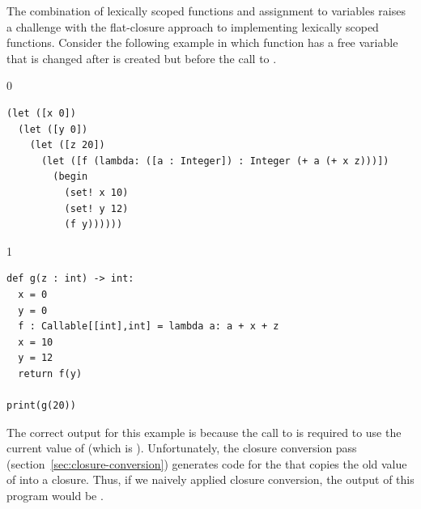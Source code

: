 \documentclass[7x10]{TimesAPriori_MIT}%
\def\racketEd{0}
\def\pythonEd{1}
\def\edition{1}
\newcommand{\pythonColor}[0]{}
\numberwithin{theorem}{chapter}
\numberwithin{definition}{chapter}
\numberwithin{equation}{chapter}
\begin{document}
The combination of lexically scoped functions and assignment to
variables raises a challenge with the flat-closure approach to
implementing lexically scoped functions. Consider the following
example in which function  has a free variable  that
is changed after  is created but before the call to .
{\if\edition\racketEd
\begin{lstlisting}
(let ([x 0])
  (let ([y 0])
    (let ([z 20])
      (let ([f (lambda: ([a : Integer]) : Integer (+ a (+ x z)))])
        (begin
          (set! x 10)
          (set! y 12)
          (f y))))))
\end{lstlisting}
\fi}
{\if\edition\pythonEd\pythonColor
\begin{lstlisting}
def g(z : int) -> int:
  x = 0
  y = 0  
  f : Callable[[int],int] = lambda a: a + x + z
  x = 10
  y = 12
  return f(y)

print(g(20))
\end{lstlisting}
\fi} The correct output for this example is  because the call
to  is required to use the current value of  (which is
). Unfortunately, the closure conversion pass
(section~\ref{sec:closure-conversion}) generates code for the
 that copies the old value of  into a
closure. Thus, if we naively applied closure conversion, the output of
this program would be .
\end{document}
